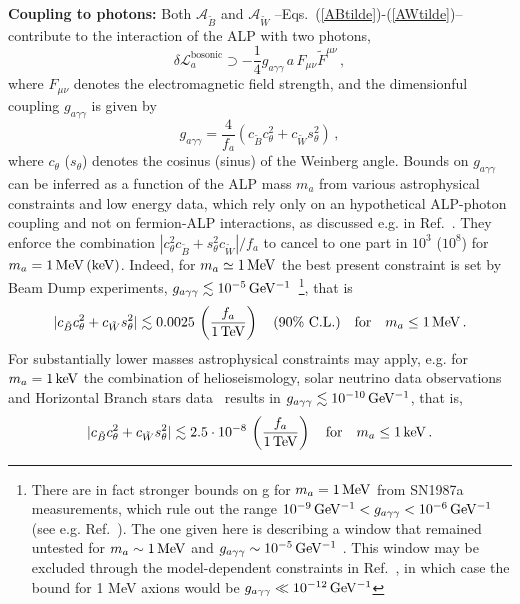 \documentclass[11pt]{article}
\newcommand{\g}{\gamma}
\newcommand{\m}{\mu}
\renewcommand{\m}{\mu}
\newcommand{\n}{\nu}
\newcommand{\A}{\mathcal{A}}
\newcommand{\st}{s_\theta}
\newcommand{\ct}{c_\theta}
\newcommand{\Bt}{{\tilde{B}}}
\newcommand{\Wt}{{\tilde{W}}}
\newcommand{\cl}{\%\,\,  \text{C.L.}}
\newcommand{\beq}{\begin{equation}}
\newcommand{\eeq}{\end{equation}}
\renewcommand{\[}{\begin{equation}}
\renewcommand{\]}{\end{equation}}
\newcommand{\LL}{\mathscr{L}}
\begin{document}
{\bf Coupling to photons: } Both $\A_{\tilde{B}}$ and $\A_{\tilde{W}}$ --Eqs.~(\ref{ABtilde})-(\ref{AWtilde})-- contribute to the interaction of the ALP with two photons,
 \beq
 \delta\LL_a^{\text{bosonic}} \supset  - \frac{1}{4}g_{a\gamma\gamma} \,a\,F_{\m\n}\tilde{F}^{\m\n}\,,
 \label{gagammagamma-def}
 \eeq
 where $F_{\m\n}$ denotes the electromagnetic field strength, and the dimensionful coupling $g_{a\g\g}$ is given by
%
\begin{equation}\label{def_agg}
 g_{a\g\g} =\frac{4}{f_a}(c_{\tilde{B}}\ct^2+c_{\tilde{W}}\st^2)\,,
\end{equation} 
%
where $\ct$ ($\st$) denotes the cosinus (sinus) of the Weinberg angle. Bounds on $g_{a\g\g}$ can be inferred as a function of the 
ALP mass $m_a$ from various astrophysical constraints and low energy data, which rely only on an hypothetical ALP-photon coupling and not on fermion-ALP interactions,  
 as discussed e.g. in Ref.~\cite{Mimasu:2014nea}. They 
  enforce the combination $|c_\theta^2c_\Bt + s_\theta^2 c_\Wt|/f_a$ to cancel to one part 
in $10^{3}$ ($10^{8}$) for $m_a=\unit[1]{MeV\, (keV)}$. 
 Indeed, for $m_a \simeq \unit[1]{MeV}$ the best present constraint is set by  
 Beam Dump experiments,  $g_{a\gamma\gamma} \lesssim \unit[10^{-5}]{GeV^{-1}}$\cite{Mimasu:2014nea,Bjorken:1984mt}~\footnote{
 There are in fact stronger bounds on g for $m_a = \unit[1]{MeV}$ from SN1987a measurements, which rule out the range $\unit[10^{-9}]{ GeV^{-1}} < g_{a\gamma\gamma} < \unit[10^{-6}]{GeV^{-1}}$ (see e.g. Ref.~\cite{Mimasu:2014nea}). The one given here is describing a window that remained untested for $m_a \sim \unit[1]{ MeV}$ and $g_{a\gamma\gamma} \sim \unit[10^{-5}]{GeV^{-1}}$ . This window may be excluded through the model-dependent constraints in Ref.~\cite{Millea:2015qra}, in which case the bound for 1 MeV axions would be $g_{a\gamma\gamma} \ll \unit[10^{-12}]{ GeV^{-1}}$}, that is  
%
\begin{equation}\label{agg_constraint}
|c_{\tilde{B}}\ct^2+c_{\tilde{W}}\st^2| \lesssim 0.0025 \,\left(\frac{f_a}{\unit[1]{TeV}} \right)\quad (90\cl)   \quad \text{for}\quad m_a \leq \unit[1]{MeV}\,.
\end{equation}
%
For substantially lower masses astrophysical constraints may apply, e.g. for  $m_a=\unit[1]{keV}$  the  combination of helioseismology, solar neutrino  data
observations~\cite{Vinyoles:2015aba} and Horizontal Branch stars  data~\cite{Raffelt:2006cw,Friedland:2012hj,Ayala:2014pea} results in $g_{a\g\g}\lesssim \unit[10^{-10}]{GeV^{-1}}$, that is, 
%
\begin{equation}\label{agg_constraint_kev}
|c_{\tilde{B}}\ct^2+c_{\tilde{W}}\st^2| \lesssim 2.5 \cdot 10^{-8} \,\left(\frac{f_a}{\unit[1]{TeV}} \right) \quad \text{for}\quad  m_a\leq\unit[1]{keV}\,.
\end{equation}
\end{document}
